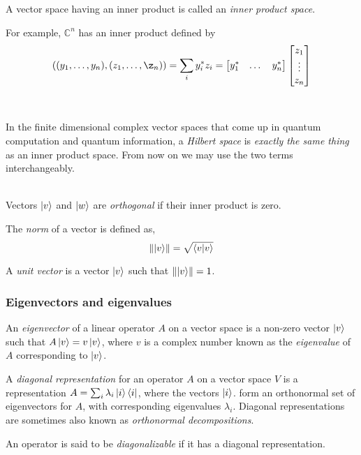 A vector space having an inner product is called an \textit{inner product space}.

For example, $\mathbb{C}^n$ has an inner product defined by
    $$((y_1,\ldots,y_n), (z_1,\ldots,\z_n)) = \sum_{i}{y_i^\ast z_i} = \begin{bmatrix}y_1^\ast & \dots & y_n^\ast\end{bmatrix} \begin{bmatrix}z_1 \\ \vdots \\ z_n\end{bmatrix}$$
\\\\
In the finite dimensional complex vector spaces that come up in quantum computation and quantum information, a \textit{Hilbert space} is \textit{exactly the same thing} as an inner product space. From now on we may use the two terms interchangeably.
\\\\
\begin{definition}
    Vectors $\ket{v}$ and $\ket{w}$ are \textit{orthogonal} if their inner product is zero.
\end{definition}
\begin{definition}
    The \textit{norm} of a vector is defined as,
        $$\norm{\ket{v}} = \sqrt{\braket{v}{v}}$$
\end{definition}
\begin{definition}
    A \textit{unit vector} is a vector $\ket{v}$ such that $\norm{\ket{v}} = 1$.
\end{definition}

\subsubsection{Eigenvectors and eigenvalues}
\begin{definition}
    An \textit{eigenvector} of a linear operator $A$ on a vector space is a non-zero vector $\ket{v}$ such that $A\ket{v} = v\ket{v}$, where $v$ is a complex number known as the \textit{eigenvalue} of $A$ corresponding to $\ket{v}$.
\end{definition}
\begin{definition}
    A \textit{diagonal representation} for an operator $A$ on a vector space $V$ is a representation $A = \sum_{i}{\lambda_i\ket{i}\bra{i}}$, where the vectors $\ket{i}$. form an orthonormal set of eigenvectors for $A$, with corresponding eigenvalues $\lambda_i$. Diagonal representations are sometimes also known as \textit{orthonormal decompositions}.
\end{definition}
\begin{definition}
    An operator is said to be \textit{diagonalizable} if it has a diagonal representation.
\end{definition}

